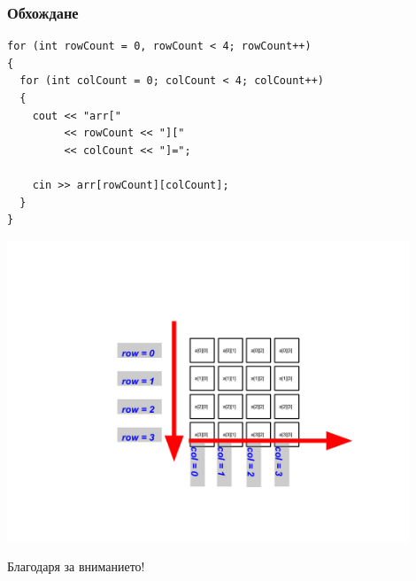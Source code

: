\documentclass{beamer}
\begin{document}
\begin{frame}[fragile]
\frametitle{Обхождане}

\begin{flushleft}

\begin{lstlisting}
for (int rowCount = 0, rowCount < 4; rowCount++)
{
  for (int colCount = 0; colCount < 4; colCount++)
  {
    cout << "arr["
         << rowCount << "]["
         << colCount << "]="; 
    
    cin >> arr[rowCount][colCount];
  }
}
\end{lstlisting}
\end{flushleft}

\vspace*{-100pt}
\hspace*{-40pt}
\includegraphics[width=12cm]{images/matr_iter_3} 

\end{frame}

\begin{frame}
\centerline{Благодаря за вниманието! }
\end{frame}
\end{document}
